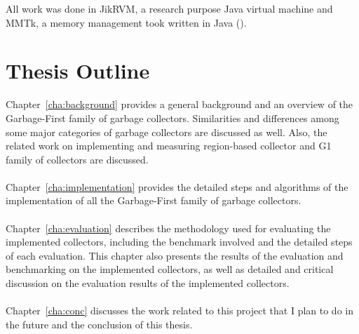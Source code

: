 All work was done in JikRVM, a research purpose Java virtual machine and MMTk,
a memory management took written in Java (\cite{blackburn2004oil}).

\section{Thesis Outline}

Chapter~\ref{cha:background}
provides a general background and an overview of the Garbage-First family of garbage collectors.
Similarities and differences among some major categories of garbage collectors are discussed as well.
Also, the related work on implementing and measuring region-based collector and G1 family
of collectors are discussed.
\\\\
Chapter~\ref{cha:implementation} provides the detailed steps and algorithms of the implementation of
all the Garbage-First family of garbage collectors.
\\\\
Chapter~\ref{cha:evaluation}
describes the methodology used for evaluating the implemented collectors,
including the benchmark involved and the detailed steps of each evaluation.
This chapter also presents the results of the evaluation and benchmarking on the implemented collectors,
as well as detailed and critical discussion on the evaluation results of the
implemented collectors.
\\\\
Chapter~\ref{cha:conc} discusses the work related to this project that I plan to do in the future and the conclusion of this thesis.